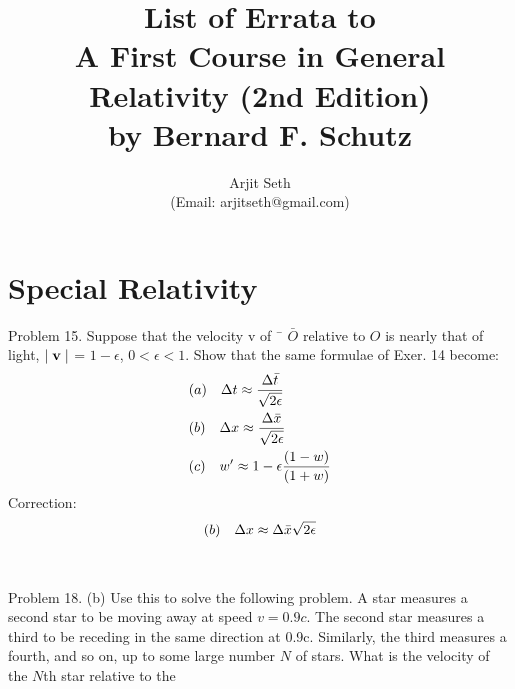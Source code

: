 \documentclass{report}
\begin{document}
\title{List of Errata to \\A First Course in General Relativity (2nd Edition)\\ by Bernard F. Schutz}

\author{Arjit Seth \\(Email: arjitseth@gmail.com)}

\maketitle

\chapter{Special Relativity}

Problem 15.
Suppose that the velocity v of
¯
$\bar{O}$ relative to $O$ is nearly that of light, $\mid{\bf v}\mid$ = $1-\epsilon$,
$0<\epsilon<1$. Show that the same formulae of Exer. 14 become:
\begin{equation}
\begin{split}
\begin{aligned}
	&(a)\hspace{10 pt} \Delta{t} \approx \frac{\Delta{\bar{t}}}{\sqrt{2\epsilon}} \\
	&(b)\hspace{10 pt} \Delta{x} \approx \frac{\Delta{\bar{x}}}{\sqrt{2\epsilon}} \\
	&(c)\hspace{10 pt} w' \approx 1-\epsilon\frac{(1-w)}{(1+w)}
\end{aligned}
\end{split}
\end{equation}
Correction:
\begin{equation}
\begin{split}
\begin{aligned}
	&(b)\hspace{10 pt} \Delta{x} \approx \Delta{\bar{x}}{\sqrt{2\epsilon}} \\
\end{aligned}
\end{split}
\end{equation} \\\\
Problem 18.
(b) Use this to solve the following problem. A star measures a second star to be moving
away at speed $v = 0.9c$. The second star measures a third to be receding in the
same direction at 0.9c. Similarly, the third measures a fourth, and so on, up to
some large number $N$ of stars. What is the velocity of the $N$th star relative to the
\end{document}
